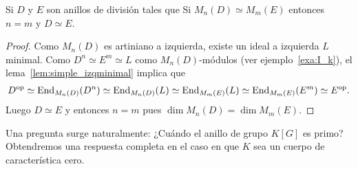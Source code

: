 \begin{theorem}
	Si $D$ y $E$ son anillos de división tales que Si $M_n(D)\simeq M_m(E)$
	entonces $n=m$ y $D\simeq E$.
\end{theorem}

\begin{proof}
	Como $M_n(D)$ es artiniano a izquierda, existe 
	un ideal a izquierda $L$ minimal. Como
	$D^{n}\simeq E^{m}\simeq L$ como $M_n(D)$-módulos (ver ejemplo~\ref{exa:I_k}), 
	el lema~\ref{lem:simple_izqminimal} implica que
	\begin{align*}
		D^{\operatorname{op}}\simeq\operatorname{End}_{M_n(D)}(D^{n})\simeq\operatorname{End}_{M_n(D)}(L)\simeq\operatorname{End}_{M_m(E)}(L)\simeq\operatorname{End}_{M_m(E)}(E^{m})\simeq E^{\operatorname{op}}.
	\end{align*}
	Luego $D\simeq E$ y entonces $n=m$ pues $\dim M_n(D)=\dim M_m(E)$.
\end{proof}


Una pregunta surge naturalmente: ¿Cuándo el anillo de grupo $K[G]$ es primo?
Obtendremos una respuesta completa en el caso en que $K$ sea un cuerpo de
característica cero. 

